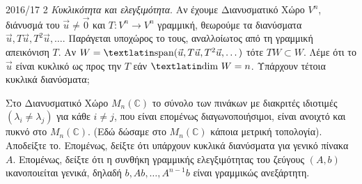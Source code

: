 \documentclass[a4paper,11pt]{article}
\begin{document}
\begin{exercise}{2016/17 2}
    \emph{Κυκλικότητα και ελεγξιμότητα}. Αν έχουμε Διανυσματικό Χώρο \( V^n \),
    διάνυσμά του \( \vec{u} \neq \vec{0} \) και \( T: V^n \to V^n \) γραμμική,
    θεωρούμε τα διανύσματα \( \vec{u}, T\vec{u}, T^2\vec{u}, \dots \). Παράγεται
    υποχώρος το  τους, αναλλοίωτος από τη γραμμική απεικόνιση \( T \).
    Αν \( W = \text{\tl{span}}(\vec{u}, T\vec{u}, T^2\vec{u}, \dots) \) τότε
    \( TW \subset W \). Λέμε ότι το \( \vec{u} \) είναι κυκλικό ως προς την
    \( T \) εάν \( \text{\tl{dim }}W = n \). Υπάρχουν τέτοια κυκλικά διανύσματα;

    Στο Διανυσματικό Χώρο \( M_n(\mathbb{C}) \) το σύνολο των πινάκων με
    διακριτές ιδιοτιμές \( (\lambda_i \neq \lambda_j) \) για κάθε \( i \neq j
    \), που είναι επομένως διαγωνοποιήσιμοι, είναι ανοιχτό και πυκνό στο \(
    M_n(\mathbb{C}) \). (Εδώ δώσαμε στο \( M_n(\mathbb{C}) \) κάποια μετρική
    τοπολογία). Αποδείξτε το. Επομένως, δείξτε ότι υπάρχουν κυκλικά διανύσματα
    για γενικό πίνακα \( A \). Επομένως, δείξτε ότι η συνθήκη
    γραμμικής ελεγξιμότητας του ζεύγους \( (A, b) \) ικανοποιείται γενικά,
    δηλαδή \( b, Ab, \dots, A^{n-1}b \) είναι γραμμικώς ανεξάρτητη.
\end{exercise}
\end{document}
